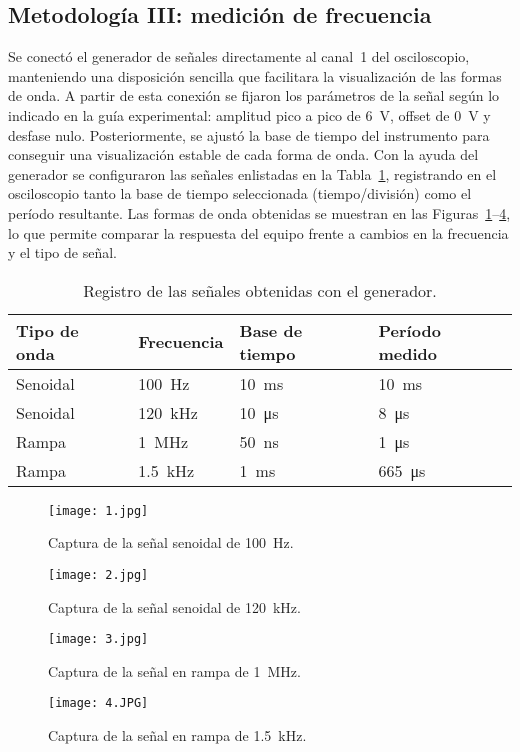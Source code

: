 \documentclass[conference]{IEEEtran} %
\begin{document}
\subsection{Metodología III: medición de frecuencia}
Se conectó el generador de señales directamente al canal~1 del osciloscopio, manteniendo una disposición sencilla que facilitara la visualización de las formas de onda. A partir de esta conexión se fijaron los parámetros de la señal según lo indicado en la guía experimental: amplitud pico a pico de \SI{6}{\volt}, offset de \SI{0}{\volt} y desfase nulo. Posteriormente, se ajustó la base de tiempo del instrumento para conseguir una visualización estable de cada forma de onda.
Con la ayuda del generador se configuraron las señales enlistadas en la Tabla~\ref{tab:frecuencia}, registrando en el osciloscopio tanto la base de tiempo seleccionada (tiempo/división) como el período resultante. Las formas de onda obtenidas se muestran en las Figuras~\ref{fig:frecuencia-senoidal-100hz}--\ref{fig:frecuencia-rampa-1k5hz}, lo que permite comparar la respuesta del equipo frente a cambios en la frecuencia y el tipo de señal.%
\begin{table}[htbp]
    \centering
    \caption{Registro de las señales obtenidas con el generador.}
    \label{tab:frecuencia}
    \begin{tabular}{@{}llll@{}}
        \toprule
        Tipo de onda & Frecuencia & Base de tiempo & Período medido \\ \midrule
        Senoidal & \SI{100}{\hertz} & \SI{10}{\milli\second} & \SI{10}{\milli\second} \\
        Senoidal & \SI{120}{\kilo\hertz} & \SI{10}{\micro\second} & \SI{8}{\micro\second} \\
        Rampa & \SI{1}{\mega\hertz} & \SI{50}{\nano\second} & \SI{1}{\micro\second} \\
        Rampa & \SI{1.5}{\kilo\hertz} & \SI{1}{\milli\second} & \SI{665}{\micro\second} \\
        \bottomrule
    \end{tabular}
\end{table}
\begin{figure}[htbp]
    \centering
    \texttt{[image: 1.jpg]}
    \caption{Captura de la señal senoidal de \SI{100}{\hertz}.}
    \label{fig:frecuencia-senoidal-100hz}
\end{figure}
\begin{figure}[htbp]
    \centering
    \texttt{[image: 2.jpg]}
    \caption{Captura de la señal senoidal de \SI{120}{\kilo\hertz}.}
    \label{fig:frecuencia-senoidal-120khz}
\end{figure}
\begin{figure}[htbp]
    \centering
    \texttt{[image: 3.jpg]}
    \caption{Captura de la señal en rampa de \SI{1}{\mega\hertz}.}
    \label{fig:frecuencia-rampa-1mhz}
\end{figure}
\begin{figure}[htbp]
    \centering
    \texttt{[image: 4.JPG]}
    \caption{Captura de la señal en rampa de \SI{1.5}{\kilo\hertz}.}
    \label{fig:frecuencia-rampa-1k5hz}
\end{figure}
\end{document}
